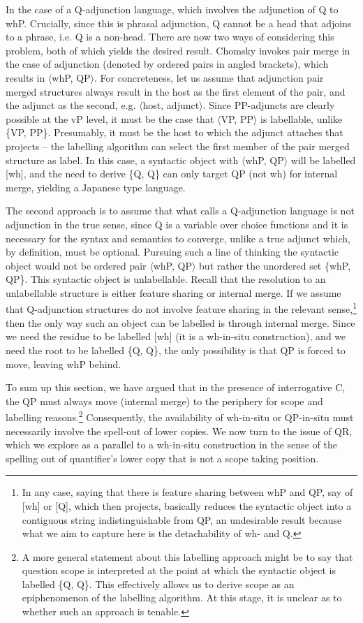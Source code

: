 \documentclass[charis]{glossa}
\begin{document}
In the case of a Q-adjunction language, which involves the adjunction of Q to whP. Crucially, since this is phrasal adjunction, Q cannot be a head that adjoins to a phrase, i.e. Q is a non-head. There are now two ways of considering this problem, both of which yields the desired result. Chomsky invokes pair merge in the case of adjunction (denoted by ordered pairs in angled brackets), which results in $\langle$whP, QP$\rangle$. For concreteness, let us assume that adjunction pair merged structures always result in the host as the first element of the pair, and the adjunct as the second, e.g. $\langle$host, adjunct$\rangle$. Since PP-adjuncts are clearly possible at the vP level, it must be the case that $\langle$VP, PP$\rangle$ is labellable, unlike \{VP, PP\}. Presumably, it must be the host to which the adjunct attaches that projects -- the labelling algorithm can select the first member of the pair merged structure as label. In this case, a syntactic object with $\langle$whP, QP$\rangle$ will be labelled [wh], and the need to derive \{Q, Q\} can only target QP (not wh) for internal merge, yielding a Japanese type language.

The second approach is to assume that what \cite{cable:2007} calls a Q-adjunction language is not adjunction in the true sense, since Q is a variable over choice functions and it is necessary for the syntax and semantics to converge, unlike a true adjunct which, by definition, must be optional. Pursuing such a line of thinking the syntactic object would not be ordered pair $\langle$whP, QP$\rangle$ but rather the unordered set \{whP, QP\}. This syntactic object is unlabellable. Recall that the resolution to an unlabellable structure is either feature sharing or internal merge. If we assume that Q-adjunction structures do not involve feature sharing in the relevant sense,\footnote{In any case, saying that there is feature sharing between whP and QP, say of [wh] or [Q], which then projects, basically reduces the syntactic object into a contiguous string indistinguishable from QP, an undesirable result because what we aim to capture here is the detachability of wh- and Q.} then the only way such an object can be labelled is through internal merge. Since we need the residue to be labelled [wh] (it is a wh-in-situ construction), and we need the root to be labelled \{Q, Q\}, the only possibility is that QP is forced to move, leaving whP behind.

To sum up this section, we have argued that in the presence of interrogative C, the QP must always move (internal merge) to the periphery for scope and labelling reasons.\footnote{A more general statement about this labelling approach might be to say that question scope is interpreted at the point at which the syntactic object is labelled \{Q, Q\}. This effectively allows us to derive scope as an epiphenomenon of the labelling algorithm. At this stage, it is unclear as to whether such an approach is tenable.} Consequently, the availability of wh-in-situ or QP-in-situ must necessarily involve the spell-out of lower copies. We now turn to the issue of QR, which we explore as a parallel to a wh-in-situ construction in the sense of the spelling out of quantifier's lower copy that is not a scope taking position.
\end{document}

